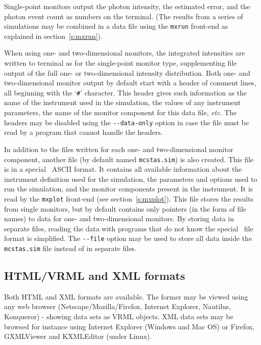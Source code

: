 Single-point monitors output the photon intensity, the estimated
error, and the photon event count as numbers on the
terminal. (The results from a series of simulations may be combined in a
data file using the \verb+mxrun+ front-end as explained in
section~\ref{s:mxrun}).

When using one- and two-dimensional monitors, the integrated
intensities are written to terminal as for the single-point monitor
type, supplementing file output of the full one- or two-dimensional
intensity distribution. Both one- and two-dimensional monitor output by default start with a
header of comment lines, all beginning with the `\verb+#+' character.
This header gives such information as the name of the instrument used in
the simulation, the values of any instrument parameters, the name of the
monitor component for this data file, \textit{etc}. The headers may be
disabled using the \verb+--data-only+ option in case the file must be
read by a program that cannot handle the headers.

In addition to the files written for each one- and two-dimensional
monitor component, another file (by default named \verb+mcstas.sim+) is
also created. This file is in a special \MCX\ ASCII format. It contains
all available information about the instrument definition used for the
simulation, the parameters and options used to run the simulation, and
the monitor components present in the instrument. It is read by the
\verb+mxplot+ front-end (see section~\ref{s:mxplot}). This file stores
the results from single monitors, but by default contains only pointers
(in the form of file names) to data for one- and two-dimensional
monitors. By storing data in separate files, reading the data with
programs that do not know the special \MCX\ file format is
simplified. The \verb+--file+ option may be used to store all data
inside the \verb+mcstas.sim+ file instead of in separate files.

\subsection{HTML/VRML and XML formats}
  

Both HTML and XML formats are available. The former may be viewed using any web browser (Netscape/Mozilla/Firefox, Internet Explorer, Nautilus, Konqueror) - showing data sets as VRML objects. XML data sets may be browsed for instance using Internet Explorer (Windows and Mac OS) or Firefox, GXMLViewer and KXMLEditor (under Linux).

